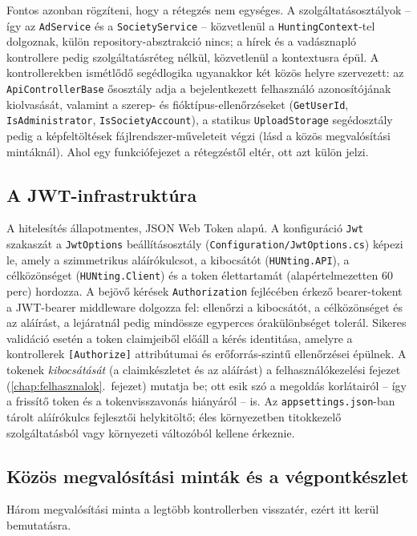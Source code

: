 Fontos azonban rögzíteni, hogy a rétegzés nem egységes. A szolgáltatásosztályok -- így az
\texttt{AdService} és a \texttt{SocietyService} -- közvetlenül a \texttt{HuntingContext}-tel
dolgoznak, külön repository-absztrakció nincs; a hírek és a vadásznapló kontrollere pedig
szolgáltatásréteg nélkül, közvetlenül a kontextusra épül. A kontrollerekben ismétlődő
segédlogika ugyanakkor két közös helyre szervezett: az \texttt{ApiControllerBase} ősosztály
adja a bejelentkezett felhasználó azonosítójának kiolvasását, valamint a szerep- és
fióktípus-ellenőrzéseket (\texttt{GetUserId}, \texttt{IsAdministrator},
\texttt{IsSocietyAccount}), a statikus \texttt{UploadStorage} segédosztály pedig a
képfeltöltések fájlrendszer-műveleteit végzi (lásd a közös megvalósítási mintáknál). Ahol egy
funkciófejezet a rétegzéstől eltér, ott azt külön jelzi.

\subsection{A JWT-infrastruktúra}

A hitelesítés állapotmentes, JSON Web Token alapú. A konfiguráció \texttt{Jwt} szakaszát a
\texttt{JwtOptions} beállításosztály (\texttt{Configuration/JwtOptions.cs}) képezi le, amely a
szimmetrikus aláírókulcsot, a kibocsátót (\texttt{HUNting.API}), a célközönséget
(\texttt{HUNting.Client}) és a token élettartamát (alapértelmezetten 60 perc) hordozza. A
bejövő kérések \texttt{Authorization} fejlécében érkező bearer-tokent a JWT-bearer middleware dolgozza
fel: ellenőrzi a kibocsátót, a célközönséget és az aláírást, a lejáratnál pedig mindössze
egyperces órakülönbséget tolerál. Sikeres validáció esetén a token claimjeiből előáll a kérés
identitása, amelyre a kontrollerek \texttt{[Authorize]} attribútumai és erőforrás-szintű
ellenőrzései épülnek. A tokenek \emph{kibocsátását} (a claimkészletet és az aláírást) a
felhasználókezelési fejezet (\ref{chap:felhasznalok}.~fejezet) mutatja be; ott esik szó a
megoldás korlátairól -- így a frissítő token és a tokenvisszavonás hiányáról -- is. Az
\texttt{appsettings.json}-ban tárolt aláírókulcs fejlesztői helykitöltő; éles környezetben
titokkezelő szolgáltatásból vagy környezeti változóból kellene érkeznie.

\subsection{Közös megvalósítási minták és a végpontkészlet}

Három megvalósítási minta a legtöbb kontrollerben visszatér, ezért itt kerül bemutatásra.

